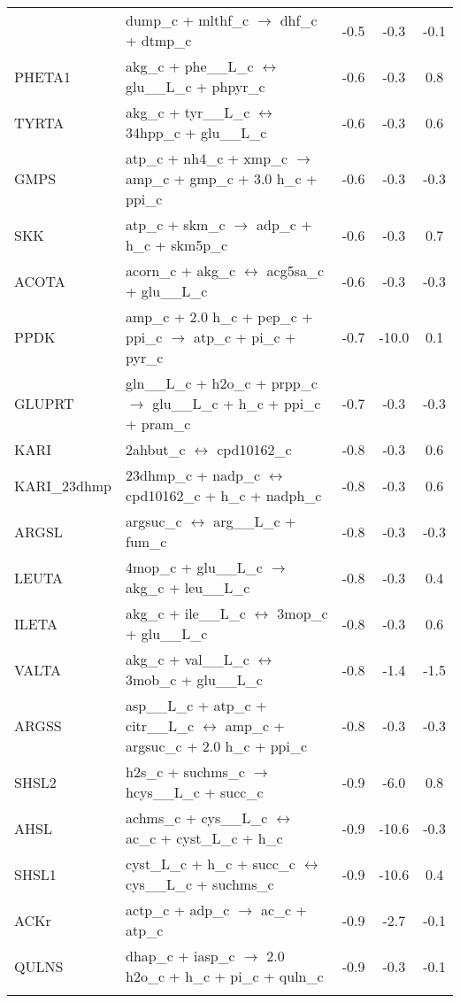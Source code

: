 \begin{longtable}{lp{}ccc}
{TMDS	&	dump\_c + mlthf\_c $\rightarrow$ dhf\_c + dtmp\_c	&	-0.5	&	-0.3	&	-0.1	\\
PHETA1	&	akg\_c + phe\_\_L\_c $\leftrightarrow$ glu\_\_L\_c + phpyr\_c	&	-0.6	&	-0.3	&	0.8	\\
TYRTA	&	akg\_c + tyr\_\_L\_c $\leftrightarrow$ 34hpp\_c + glu\_\_L\_c	&	-0.6	&	-0.3	&	0.6	\\
GMPS	&	atp\_c + nh4\_c + xmp\_c $\rightarrow$ amp\_c + gmp\_c + 3.0 h\_c + ppi\_c	&	-0.6	&	-0.3	&	-0.3	\\
SKK	&	atp\_c + skm\_c $\rightarrow$ adp\_c + h\_c + skm5p\_c	&	-0.6	&	-0.3	&	0.7	\\
ACOTA	&	acorn\_c + akg\_c $\leftrightarrow$ acg5sa\_c + glu\_\_L\_c	&	-0.6	&	-0.3	&	-0.3	\\
PPDK	&	amp\_c + 2.0 h\_c + pep\_c + ppi\_c $\rightarrow$ atp\_c + pi\_c + pyr\_c	&	-0.7	&	-10.0	&	0.1	\\
GLUPRT	&	gln\_\_L\_c + h2o\_c + prpp\_c $\rightarrow$ glu\_\_L\_c + h\_c + ppi\_c + pram\_c	&	-0.7	&	-0.3	&	-0.3	\\
KARI	&	2ahbut\_c $\leftrightarrow$ cpd10162\_c	&	-0.8	&	-0.3	&	0.6	\\
KARI\_23dhmp	&	23dhmp\_c + nadp\_c $\leftrightarrow$ cpd10162\_c + h\_c + nadph\_c	&	-0.8	&	-0.3	&	0.6	\\
ARGSL	&	argsuc\_c $\leftrightarrow$ arg\_\_L\_c + fum\_c	&	-0.8	&	-0.3	&	-0.3	\\
LEUTA	&	4mop\_c + glu\_\_L\_c $\rightarrow$ akg\_c + leu\_\_L\_c	&	-0.8	&	-0.3	&	0.4	\\
ILETA	&	akg\_c + ile\_\_L\_c $\leftrightarrow$ 3mop\_c + glu\_\_L\_c	&	-0.8	&	-0.3	&	0.6	\\
VALTA	&	akg\_c + val\_\_L\_c $\leftrightarrow$ 3mob\_c + glu\_\_L\_c	&	-0.8	&	-1.4	&	-1.5	\\
ARGSS	&	asp\_\_L\_c + atp\_c + citr\_\_L\_c $\leftrightarrow$ amp\_c + argsuc\_c + 2.0 h\_c + ppi\_c	&	-0.8	&	-0.3	&	-0.3	\\
SHSL2	&	h2s\_c + suchms\_c $\rightarrow$ hcys\_\_L\_c + succ\_c	&	-0.9	&	-6.0	&	0.8	\\
AHSL	&	achms\_c + cys\_\_L\_c $\leftrightarrow$ ac\_c + cyst\_L\_c + h\_c	&	-0.9	&	-10.6	&	-0.3	\\
SHSL1	&	cyst\_L\_c + h\_c + succ\_c $\leftrightarrow$ cys\_\_L\_c + suchms\_c	&	-0.9	&	-10.6	&	0.4	\\
ACKr	&	actp\_c + adp\_c $\rightarrow$ ac\_c + atp\_c	&	-0.9	&	-2.7	&	-0.1	\\
QULNS	&	dhap\_c + iasp\_c $\rightarrow$ 2.0 h2o\_c + h\_c + pi\_c + quln\_c	&	-0.9	&	-0.3	&	-0.1	\\
}
\end{longtable}

